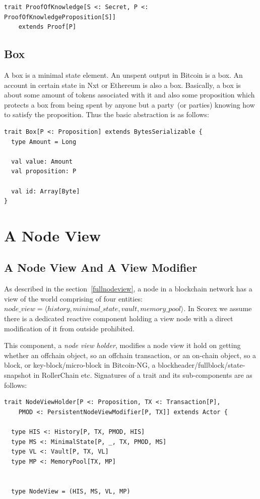 \documentclass[]{report}   %
\begin{document}
\begin{lstlisting}
trait ProofOfKnowledge[S <: Secret, P <: ProofOfKnowledgeProposition[S]]
	extends Proof[P]
\end{lstlisting}

\subsection{Box}

A box is a minimal state element. An unspent output in Bitcoin is a box. An account in certain state in Nxt or Ethereum is also a box. Basically, a box is about some amount of tokens associated with it and also some proposition which protects a box from being spent by anyone but a party~(or parties) knowing how to satisfy the proposition. Thus the basic abstraction is as follows:

\begin{lstlisting}
trait Box[P <: Proposition] extends BytesSerializable {
  type Amount = Long

  val value: Amount
  val proposition: P

  val id: Array[Byte]
}
\end{lstlisting}

\section{A Node View}

\subsection{A Node View And A View Modifier}

As described in the section~\ref{fullnodeview}, a node in a blockchain network has a view of the world comprising of four entities:
\(node\_view = \langle history, minimal\_state, vault, memory\_pool \rangle \). In Scorex we assume there is a dedicated reactive component holding a view node with a direct modification of it from outside prohibited.

This component, a \textit{node view holder}, modifies a node view it hold on getting whether an offchain object, so an offchain transaction, or an on-chain object, so a block, or key-block/micro-block in Bitcoin-NG, a blockheader/fullblock/state-snapshot in RollerChain etc. Signatures of a trait and its sub-components are as follows:

\begin{lstlisting}
trait NodeViewHolder[P <: Proposition, TX <: Transaction[P],
	PMOD <: PersistentNodeViewModifier[P, TX]] extends Actor {

  type HIS <: History[P, TX, PMOD, HIS]
  type MS <: MinimalState[P, _, TX, PMOD, MS]
  type VL <: Vault[P, TX, VL]
  type MP <: MemoryPool[TX, MP]


  type NodeView = (HIS, MS, VL, MP)
\end{lstlisting}
\end{document}
